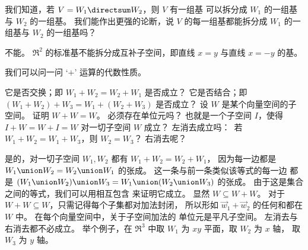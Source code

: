 \begin{exercises}
    我们知道，若 \( V=W_1\directsum W_2 \)，则 \( V \) 有一组基
    可以拆分成 \( W_1 \) 的一组基与
    \( W_2 \) 的一组基。
    我们能作出更强的论断，说 \( V \) 的每一组基都能拆分成
    \( W_1 \) 的一组基与 \( W_2 \) 的一组基吗？
    \begin{answer}
      不能。
      \( \Re^2 \) 的标准基不能拆分成互补子空间，即直线 \( x=y \) 与直线
      \( x=-y \) 的基。  
    \end{answer}
  \item 
     我们可以问一问 `$+$' 运算的代数性质。
     \begin{exparts}
       \partsitem 它是否交换；即 \( W_1+W_2=W_2+W_1 \) 是否成立？
       \partsitem 它是否结合；即 \( (W_1+W_2)+W_3=W_1+(W_2+W_3) \)
         是否成立？
       \partsitem 设 \( W \) 是某个向量空间的子空间。
         证明 \( W+W=W \)。
       \partsitem 必须存在单位元吗？
         也就是一个子空间 \( I \)，使得 \( I+W=W+I=W \)
         对一切子空间 \( W \) 成立？ 
       \partsitem 左消去成立吗：~若
          \( W_1+W_2=W_1+W_3 \)，则 \( W_2=W_3 \)？
          右消去呢？
     \end{exparts}
    \begin{answer}
      \begin{exparts}
        \partsitem  是的，对一切子空间 \( W_1,W_2 \)
          都有 \( W_1+W_2=W_2+W_1 \)，
          因为每一边都是 \( W_1\union W_2=W_2\union W_1 \) 的张成。
        \partsitem 这一条与前一条类似\Dash 该等式的每一边
          都是
          \( (W_1\union W_2)\union W_3=W_1\union (W_2\union W_3) \)
          的张成。
        \partsitem 由于这是集合之间的等式，我们可以用相互包含
          来证明它成立。
          显然 \( W\subseteq W+W \)。
          对于 \( W+W\subseteq W \)，只需记得每个子集都对加法封闭，
          所以形如 \( \vec{w}_1+\vec{w}_2 \) 的任何和都在
          \( W \) 中。
        \partsitem 在每个向量空间中，关于子空间加法的
          单位元是平凡子空间。
        \partsitem   左消去与右消去都不必成立。
          举个例子，在 \( \Re^3 \) 中取 \( W_1 \) 为
          \( xy \) 平面，取 \( W_2 \) 为 \( x \) 轴，
          取 \( W_3 \) 为 \( y \) 轴。  
      \end{exparts}
     \end{answer}

\end{exercises}
